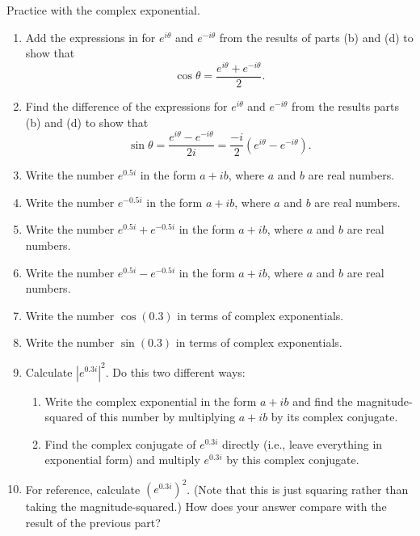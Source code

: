 \begin{aproblem}{Practice with the complex exponential.}
\begin{enumerate}
  \item Add the expressions in for $e^{i\theta}$ and $e^{-i\theta}$
    from the results of parts (b) and (d) to show that
    \[ \cos\theta = \frac{e^{i\theta} + e^{-i\theta}}{2}. \]

  \item Find the difference of the expressions for $e^{i\theta}$ and
    $e^{-i\theta}$ from the results parts (b) and (d) to show that
    \[ \sin\theta = \frac{e^{i\theta} - e^{-i\theta}}{2i} = 
    \frac{-i}{2}\left(e^{i\theta} - e^{-i\theta}\right). \]

  \item Write the number $e^{0.5i}$ in the form $a + ib$, where $a$
    and $b$ are real numbers.

  \item Write the number $e^{-0.5i}$ in the form $a + ib$, where $a$
    and $b$ are real numbers.
   
  \item Write the number $e^{0.5i} + e^{-0.5i}$ in the form $a + ib$,
    where $a$ and $b$ are real numbers.

  \item Write the number $e^{0.5i} - e^{-0.5i}$ in the form $a + ib$,
    where $a$ and $b$ are real numbers.

  \item Write the number $\cos(0.3)$ in terms of complex exponentials.

  \item Write the number $\sin(0.3)$ in terms of complex exponentials.

  \item Calculate $|e^{0.3i}|^2$.  Do this two different ways:
    \begin{enumerate}
    \item Write the complex exponential in the form $a + ib$ and find
      the magnitude-squared of this number by multiplying $a+ib$ by
      its complex conjugate.
    \item Find the complex conjugate of $e^{0.3i}$ directly (i.e.,
      leave everything in exponential form) and multiply $e^{0.3i}$ by
      this complex conjugate.
    \end{enumerate}

  \item For reference, calculate $(e^{0.3i})^2$.  (Note that this is
    just squaring rather than taking the magnitude-squared.)  How does
    your answer compare with the result of the previous part?

  \end{enumerate}
\end{aproblem}


